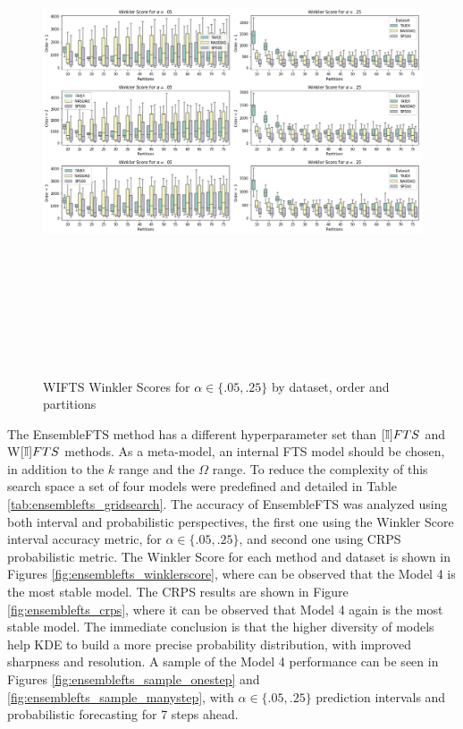 \begin{figure}[htb]
    \centering
    \includegraphics[width=\textwidth,height=15cm]{figures/wifts_gridsearch.png}
    \caption{WIFTS Winkler Scores for $\alpha \in \{.05, .25\}$ by dataset, order and partitions}
    \label{fig:wifts_gridsearch}
\end{figure}

The EnsembleFTS method has a different hyperparameter set than $[\mathbb{I}]FTS$ and W$[\mathbb{I}]FTS$ methods. As a meta-model, an internal FTS model should be chosen, in addition to the $k$ range and the $\Omega$ range. To reduce the complexity of this search space a set of four models were predefined and detailed in Table \ref{tab:ensemblefts_gridsearch}. The accuracy of EnsembleFTS was analyzed using both interval and probabilistic perspectives, the first one using the Winkler Score interval accuracy metric, for  $\alpha \in \{.05, .25\}$, and second one using CRPS probabilistic metric. The Winkler Score for each method and dataset is shown in Figures \ref{fig:ensemblefts_winklerscore}, where can be observed that the Model 4 is the most stable model. The CRPS results are shown in Figure  \ref{fig:ensemblefts_crps}, where it can be observed that Model 4 again is the most stable model. The immediate conclusion is that the higher diversity of models help KDE to build a more precise probability distribution, with improved sharpness and resolution.  A sample of the Model 4 performance can be seen in Figures \ref{fig:ensemblefts_sample_onestep} and \ref{fig:ensemblefts_sample_manystep}, with $\alpha \in \{.05, .25\}$ prediction intervals and probabilistic forecasting for 7 steps ahead.  

